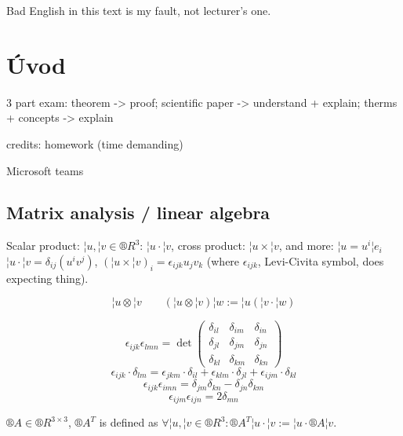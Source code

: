 \documentclass[12pt]{article}					%
\begin{document}
\begin{poznamka}
	Bad English in this text is my fault, not lecturer's one.
\end{poznamka}

\section*{Úvod}
\begin{poznamka}
	3 part exam: theorem -> proof; scientific paper -> understand + explain; therms + concepts -> explain

	credits: homework (time demanding)

	Microsoft teams
\end{poznamka}

\subsection{Matrix analysis / linear algebra}
\begin{poznamka}
	Scalar product: $¦u, ¦v \in ®R^3$: $¦u·¦v$, cross product: $¦u \times ¦v$, and more: $¦u = u^i ¦e_i$ $¦u·¦v = \delta_{ij}(u^i v^j)$, $(¦u \times ¦v)_i = \epsilon_{ijk}u_jv_k$ (where $\epsilon_{ijk}$, Levi-Civita symbol, does expecting thing).
\end{poznamka}

\begin{definice}
	$$ ¦u \otimes ¦v \qquad (¦u \otimes ¦v)¦w := ¦u(¦v·¦w) $$
\end{definice}

\begin{tvrzeni}
	$$ \epsilon_{ijk}\epsilon_{lmn} = \det \begin{pmatrix} \delta_{il} & \delta_{im} & \delta_{in} \\ \delta_{jl} & \delta_{jm} & \delta_{jn} \\ \delta_{kl} & \delta_{km} & \delta_{kn} \end{pmatrix} $$
	$$ \epsilon_{ijk}·\delta_{lm} = \epsilon_{jkm}·\delta_{il} + \epsilon_{klm}·\delta_{jl} + \epsilon_{ijm}·\delta_{kl} $$
	$$ \epsilon_{ijk}\epsilon_{imn} = \delta_{jm} \delta_{kn} - \delta_{jn} \delta_{km} $$
	$$ \epsilon_{ijm}\epsilon_{ijn} = 2\delta_{mn} $$
\end{tvrzeni}

\begin{definice}
	$®A \in ®R^{3 \times 3}$, $®A^T$ is defined as $\forall ¦u, ¦v \in ®R^3: ®A^T ¦u · ¦v := ¦u·®A ¦v$.
\end{definice}
\end{document}
